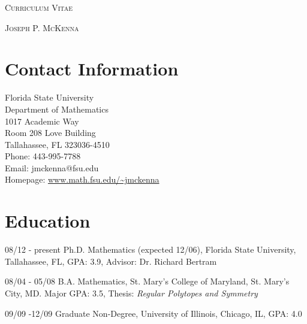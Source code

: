 \documentclass[a4paper]{article}
\begin{document}
\pagestyle{empty}

\begin{center}
\Large{\textsc{Curriculum Vitae}}
\vspace{\baselineskip}

\large{\textsc{Joseph P. McKenna}}
\end{center}
\vspace{1.5\baselineskip}

\section{Contact Information}
\begin{flushleft}
Florida State University\\
Department of Mathematics\\
1017 Academic Way\\
Room 208 Love Building\\
Tallahassee, FL 323036-4510\\
Phone: 443-995-7788 \\
Email: jmckenna@fsu.edu \\
Homepage: \url{www.math.fsu.edu/~jmckenna} \\
\end{flushleft}


\section{Education}
\begin{CV}
\item[08/12 - present] Ph.D. Mathematics (expected 12/06), Florida State University, Tallahassee, FL, GPA: 3.9, Advisor: Dr. Richard Bertram
\item[08/04 - 05/08] B.A. Mathematics, St. Mary's College of Maryland, St. Mary's City, MD. Major GPA: 3.5, Thesis: \emph{Regular Polytopes and Symmetry}
\item[09/09 -12/09] Graduate Non-Degree, University of Illinois, Chicago, IL, GPA: 4.0 
\end{CV}
\end{document}

